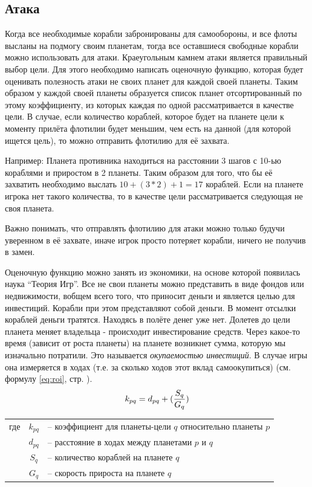 \documentclass[12pt]{report}
\begin{document}
\subsection{Атака}
\label{sec:atack}
Когда все необходимые корабли забронированы для самообороны, и все флоты высланы на подмогу своим планетам, тогда все оставшиеся свободные корабли можно использовать для атаки. Краеугольным камнем атаки является правильный выбор цели. Для этого необходимо написать оценочную функцию, которая будет оценивать полезность атаки не своих планет для каждой своей планеты. Таким образом у каждой своей планеты образуется список планет отсортированный по этому коэффициенту, из которых каждая по одной рассматривается в качестве цели. В случае, если количество кораблей, которое будет на планете цели к моменту прилёта флотилии будет меньшим, чем есть на данной (для которой ищется цель), то можно отправить флотилию для её захвата. 

Например: Планета противника находиться на расстоянии 3 шагов с 10-ью кораблями и приростом в 2 планеты. Таким образом для того, что бы её захватить необходимо выслать $10 + (3 * 2) + 1 = 17$ кораблей. Если на планете игрока нет такого количества, то в качестве цели рассматривается следующая не своя планета.

Важно понимать, что отправлять флотилию для атаки можно только будучи уверенном в её захвате, иначе игрок просто потеряет корабли, ничего не получив в замен. 

Оценочную функцию можно занять из экономики, на основе которой появилась наука ``Теория Игр''. Все не свои планеты можно представить в виде фондов или недвижимости, вобщем всего того, что приносит деньги и является целью для инвестиций. Корабли при этом представляют собой деньги. В момент отсылки кораблей деньги тратятся. Находясь в полёте денег уже нет. Долетев до цели планета меняет владельца - происходит инвестирование средств. Через какое-то время (зависит от роста планеты) на планете возникнет сумма, которую мы изначально потратили. Это называется \emph{окупаемостью инвестиций}. В случае игры она измеряется в ходах (т.е. за сколько ходов этот вклад самоокупиться) (см. формулу \ref{eq:roi}, стр. \pageref{eq:roi}).
\pagebreak
\begin{equation}
\label{eq:roi}
\centering
k_{pq} = d_{pq} + (\frac{S_q}{G_q})
\end{equation}
\begin{tabular}{p{3cm} c l}
где & $k_{pq}$ & -- коэффициент для планеты-цели $q$ относительно планеты $p$ \\
	& $d_{pq}$ & -- расстояние в ходах между планетами $p$ и $q$ \\
	& $S_q$ & -- количество кораблей на планете $q$ \\
	& $G_q$ & -- скорость прироста на планете $q$ \\
\end{tabular}
\end{document}
